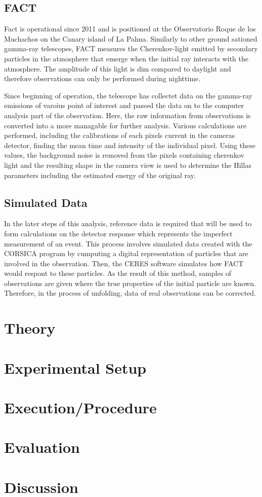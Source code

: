     \subsection{FACT}
    Fact is operational since 2011 and is positioned at the Observatorio Roque de los Muchachos on the Canary island of La Palma.    
    Similarly to other ground sationed gamma-ray telescopes, FACT measures the Cherenkov-light emitted by secondary particles in the atmosphere that emerge when the initial ray interacts with the atmosphere.
    The amplitude of this light is dim compared to daylight and therefore observations can only be performed during nighttime.

    Since beginning of operation, the telescope has collectet data on the gamma-ray emissions of varoius point of interest and passed the data on to the computer analysis part of the observation.
    Here, the raw information from observations is converted into a more managable for further analysis.
    Various calculations are performed, including the calibrations of each pixels current in the cameras detector, finding the mean time and intensity of the individual pixel.
    Using these values, the background noise is removed from the pixels containing cherenkov light and the resulting shape in the camera view is used to determine the Hillas parameters including the estimated energy of the original ray.

    \subsection{Simulated Data}
    In the later steps of this analysis, reference data is required that will be used to form calculations on the detector response which represents the imperfect measurement of an event.
    This process involves simulated data created with the CORSICA program by cumputing a digital representation of particles that are involved in the observation.
    Then, the CERES software simulates how FACT would respont to these particles.
    As the result of this method, samples of observations are given where the true properties of the initial particle are known.
    Therefore, in the process of unfolding, data of real observations can be corrected. 
%
%
    \section{Theory}


%
%
    \section{Experimental Setup}

%
%
    \section{Execution/Procedure}
    
%
%
    \section{Evaluation}


%
%
    \section{Discussion}

\newpage
\printbibliography
\newpage

